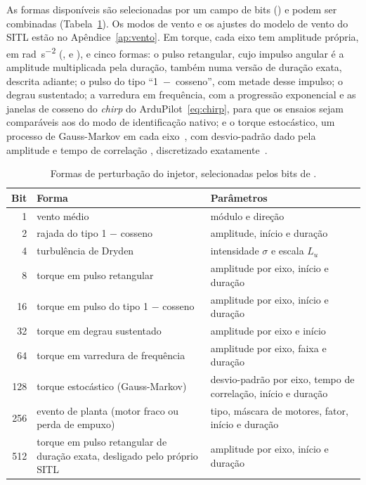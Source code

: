 As formas disponíveis são selecionadas por um campo de bits
() e podem ser combinadas
(Tabela~\ref{tab:modos-injetor}). Os modos de vento e os ajustes do modelo de
vento do SITL estão no Apêndice~\ref{ap:vento}. Em torque, cada eixo tem amplitude própria, em
\si{\radian\per\second\squared} (,  e
), e cinco formas: o pulso retangular, cujo impulso angular
é a amplitude multiplicada pela duração, também numa versão de duração
exata, descrita adiante; o pulso do tipo
``1~$-$~cosseno'', com metade desse impulso; o degrau sustentado; a
varredura em frequência, com a progressão exponencial e as janelas de
cosseno do \textit{chirp} do ArduPilot~\eqref{eq:chirp}, para que os ensaios
sejam comparáveis aos do modo de identificação nativo; e o torque
estocástico, um processo de Gauss-Markov em cada
eixo~\cite{uhlenbeck1930}, com desvio-padrão dado pela amplitude e tempo de
correlação , discretizado exatamente~\cite{gillespie1996}.

\begin{table}[htbp]
\centering
\caption{Formas de perturbação do injetor, selecionadas pelos bits de
.}
\label{tab:modos-injetor}
\small
\begin{tabular}{rp{5.4cm}p{6.4cm}}
\toprule
Bit & Forma & Parâmetros \\
\midrule
1   & vento médio                          & módulo e direção \\
2   & rajada do tipo 1 $-$ cosseno         & amplitude, início e duração \\
4   & turbulência de Dryden                & intensidade $\sigma$ e escala $L_u$ \\
8   & torque em pulso retangular           & amplitude por eixo, início e duração \\
16  & torque em pulso do tipo 1 $-$ cosseno & amplitude por eixo, início e duração \\
32  & torque em degrau sustentado          & amplitude por eixo e início \\
64  & torque em varredura de frequência    & amplitude por eixo, faixa e duração \\
128 & torque estocástico (Gauss-Markov)    & desvio-padrão por eixo, tempo de correlação, início e duração \\
256 & evento de planta (motor fraco ou perda de empuxo) & tipo, máscara de motores, fator, início e duração \\
512 & torque em pulso retangular de duração exata, desligado pelo próprio SITL & amplitude por eixo, início e duração \\
\bottomrule
\end{tabular}

\end{table}

